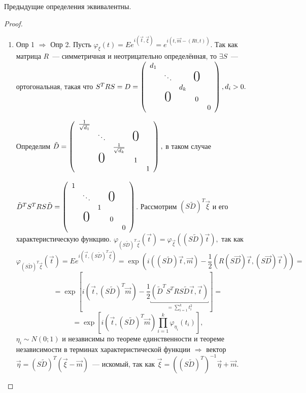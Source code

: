 	\begin{theorem}
		Предыдущие определения эквивалентны.
	\end{theorem}
	\begin{proof}
		\begin{enumerate}
			\item Опр 1 \(\Rightarrow\) Опр 2. Пусть \(\varphi_\xi(t) = Ee^{i(\vec{t},\vec{\xi})} = e^{i(t, \vec{m} - (Rt, t))}\). Так как матрица \(R\)~--- симметричная и неотрицательно определённая, то \(\exists S\)~---  ортогональная, такая что \(S^T RS = D = \left(
    \begin{array}{ccccc}
         d_1                              \\
                   &\ddots &  & \text{\huge0}\\
      &               & d_k               \\
      & \text{\huge0} &   & 0            \\
      &               &   &   & 0
    \end{array}
    \right), d_i > 0.\)

    Определим \(\tilde{D} = \left(
    \begin{array}{ccccc}
         \frac{1}{\sqrt{d_1}}                              \\
                   &\ddots &  & \text{\huge0}\\
      &               & \frac{1}{\sqrt{d_k}}               \\
      & \text{\huge0} &   & 1            \\
      &               &   &   & 1
    \end{array}
    \right),\) в таком случае 

    \(\tilde{D}^TS^TRS\tilde{D} = \left(
    \begin{array}{ccccc}
         1                              \\
                   &\ddots &  & \text{\huge0}\\
      &               & 1               \\
      & \text{\huge0} &   & 0            \\
      &               &   &   & 0
    \end{array}
    \right)\). Рассмотрим \((S\tilde{D})^T\vec{\xi}\) и его характеристическую функцию. \(\varphi_{(S\tilde{D})^T\vec{\xi}}(\vec{t}) = \varphi_{\vec{\xi}}((S\tilde{D})\vec{t}),\) так как
    \[
    	\varphi_{(S\tilde{D})^T\vec{\xi}}(\vec{t}) = Ee^{i(\vec{t}, (S\tilde{D})^T\vec{\xi})} = \exp(i((S\tilde{D})\vec{t}, \vec{m}) - \frac{1}{2}(R(S\vec{D})\vec{t}, (S\vec{D})\vec{t})) = 
    \]
    \[
    	=\exp[i(\vec{t}, (S\tilde{D})^T\vec{m}) - \frac{1}{2}\underbracket{(\tilde{D}^TS^TRS\tilde{D}\vec{t}, \vec{t})}_{=\sum\limits_{i = 1}^{k}t_i^2}] = 
    \]
    \[
    	= \exp[i(\vec{t}, (S\tilde{D})^T\vec{m})\prod\limits_{i = 1}^k \varphi_{\eta_i}(t_i)], 
    \]
    \(\eta_i \sim N(0;1)\) и независимы по теореме единственности и теореме независимости в терминах характеристической функции \(\Rightarrow\) вектор \(\vec{\eta} = (S\tilde{D})^T(\vec{\xi} - \vec{m})\)~--- искомый, так как \(\vec{\xi} = ((S\tilde{D})^T)^{-1}\vec{\eta}+\vec{m}.\)


\end{enumerate}
\end{proof}
